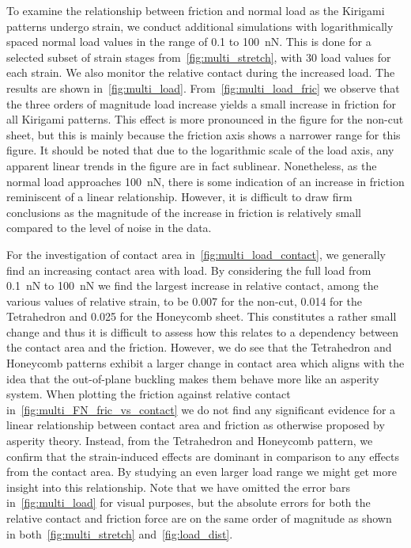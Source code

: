To examine the relationship between friction and normal load as the Kirigami
patterns undergo strain, we conduct additional simulations with logarithmically spaced normal load values in the range of 0.1 to \SI{100}{nN}. This
is done for a selected subset of strain stages
from~\cref{fig:multi_stretch}, with 30 load values for each
strain. We also monitor the relative contact during the increased load. The
results are shown in~\cref{fig:multi_load}. From~\cref{fig:multi_load_fric} we observe that the three orders of magnitude load increase yields a small increase in friction for all Kirigami patterns. This effect
is more pronounced in the figure for the non-cut sheet, but this is mainly because the friction axis shows a narrower range for this figure. It
should be noted that due to the logarithmic scale of the load axis, any apparent
linear trends in the figure are in fact sublinear. Nonetheless, as the normal load
approaches \SI{100}{nN}, there is some indication of an increase in friction
reminiscent of a linear relationship. However, it is difficult to draw firm
conclusions as the magnitude of the increase in friction is relatively small
compared to the level of noise in the data. 

For the investigation of contact area in~\cref{fig:multi_load_contact}, we generally find an increasing contact area with load. By
considering the full load from \SI{0.1}{nN} to \SI{100}{nN} we find the largest increase in relative contact, among the various values of relative strain, to be 0.007 for the non-cut, 0.014 for the Tetrahedron and 0.025 for the Honeycomb
sheet. This constitutes a rather small change and thus it is difficult to assess
how this relates to a dependency between the contact area and the friction.
However, we do see that the Tetrahedron and Honeycomb patterns exhibit a larger
change in contact area which aligns with the idea that the out-of-plane buckling makes them
behave more like an asperity system. When plotting the friction against relative contact in~\cref{fig:multi_FN_fric_vs_contact} we do not find any significant evidence for a linear relationship between contact area and friction as otherwise proposed by asperity theory. Instead, from the Tetrahedron and Honeycomb pattern, we confirm that the strain-induced effects are dominant in comparison to any effects from the contact area. By studying an even larger load range we might
get more insight into this relationship. Note that we have omitted the error bars in~\cref{fig:multi_load} for visual purposes, but the absolute errors for both the relative contact and friction force are on the same order of magnitude as shown in both~\cref{fig:multi_stretch} and~\cref{fig:load_dist}.

